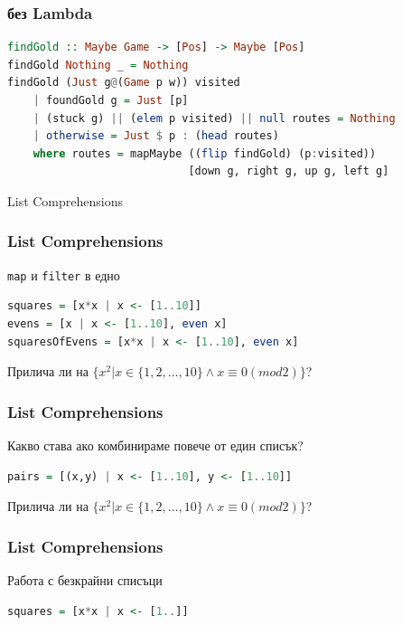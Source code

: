 \documentclass{beamer}
\begin{document}
\begin{frame}[fragile]
  \frametitle{без Lambda}

\begin{lstlisting}[basicstyle=\tiny,language=Haskell]
findGold :: Maybe Game -> [Pos] -> Maybe [Pos]
findGold Nothing _ = Nothing
findGold (Just g@(Game p w)) visited
    | foundGold g = Just [p]
    | (stuck g) || (elem p visited) || null routes = Nothing
    | otherwise = Just $ p : (head routes)
    where routes = mapMaybe ((flip findGold) (p:visited))
                            [down g, right g, up g, left g]  
\end{lstlisting}
  
\end{frame}

\begin{frame}
  \centerline{List Comprehensions}
\end{frame}

\begin{frame}[fragile]
  \frametitle{List Comprehensions}

\verb#map# и \verb#filter# в едно

\bigskip

\begin{lstlisting}[basicstyle=\small,language=Haskell]
squares = [x*x | x <- [1..10]]
evens = [x | x <- [1..10], even x]
squaresOfEvens = [x*x | x <- [1..10], even x]
\end{lstlisting}
  
\bigskip

Прилича ли на $\{x^2 | x \in \{1,2,\dots,10\} \land x \equiv 0 (mod 2)\}$?
\end{frame}


\begin{frame}[fragile]
  \frametitle{List Comprehensions}

Какво става ако комбинираме повече от един списък?

\bigskip

\begin{lstlisting}[basicstyle=\small,language=Haskell]
pairs = [(x,y) | x <- [1..10], y <- [1..10]]
\end{lstlisting}
  
\bigskip

Прилича ли на $\{x^2 | x \in \{1,2,\dots,10\} \land x \equiv 0 (mod 2)\}$?
\end{frame}

\begin{frame}[fragile]
  \frametitle{List Comprehensions}

Работа с безкрайни списъци

\bigskip

\begin{lstlisting}[basicstyle=\small,language=Haskell]
squares = [x*x | x <- [1..]]
\end{lstlisting}
  
\end{frame}
\end{document}

